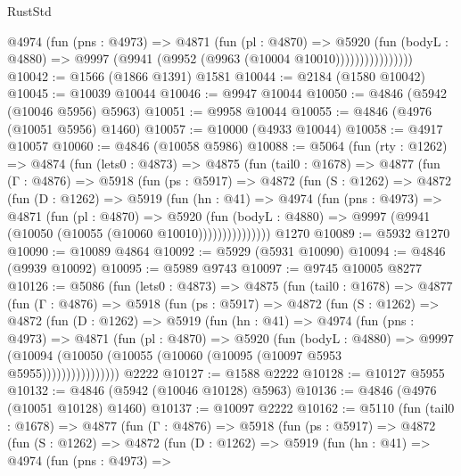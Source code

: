 \begin{lexlean}{RustStd}
\begin{coremodule}
                    @4974
                      (fun (pns : @4973) =>
                      @4871
                        (fun (pl : @4870) =>
                        @5920
                          (fun (bodyL : @4880) =>
                          @9997 (@9941 (@9952 (@9963 (@10004 @10010))))))))))))))))
@10042 := @1566 (@1866 @1391) @1581
@10044 := @2184 (@1580 @10042)
@10045 := @10039 @10044
@10046 := @9947 @10044
@10050 := @4846 (@5942 (@10046 @5956) @5963)
@10051 := @9958 @10044
@10055 := @4846 (@4976 (@10051 @5956) @1460)
@10057 := @10000 (@4933 @10044)
@10058 := @4917 @10057
@10060 := @4846 (@10058 @5986)
@10088 := @5064
    (fun (rty : @1262) =>
    @4874
      (fun (lets0 : @4873) =>
      @4875
        (fun (tail0 : @1678) =>
        @4877
          (fun (Γ : @4876) =>
          @5918
            (fun (ps : @5917) =>
            @4872
              (fun (S : @1262) =>
              @4872
                (fun (D : @1262) =>
                @5919
                  (fun (hn : @41) =>
                  @4974
                    (fun (pns : @4973) =>
                    @4871
                      (fun (pl : @4870) =>
                      @5920
                        (fun (bodyL : @4880) =>
                        @9997 (@9941 (@10050 (@10055 (@10060 @10010)))))))))))))))
    @1270
@10089 := @5932 @1270
@10090 := @10089 @4864
@10092 := @5929 (@5931 @10090)
@10094 := @4846 (@9939 @10092)
@10095 := @5989 @9743
@10097 := @9745 @10005 @8277
@10126 := @5086
    (fun (lets0 : @4873) =>
    @4875
      (fun (tail0 : @1678) =>
      @4877
        (fun (Γ : @4876) =>
        @5918
          (fun (ps : @5917) =>
          @4872
            (fun (S : @1262) =>
            @4872
              (fun (D : @1262) =>
              @5919
                (fun (hn : @41) =>
                @4974
                  (fun (pns : @4973) =>
                  @4871
                    (fun (pl : @4870) =>
                    @5920
                      (fun (bodyL : @4880) =>
                      @9997
                        (@10094 (@10050 (@10055 (@10060 (@10095 (@10097 @5953 @5955))))))))))))))))
    @2222
@10127 := @1588 @2222
@10128 := @10127 @5955
@10132 := @4846 (@5942 (@10046 @10128) @5963)
@10136 := @4846 (@4976 (@10051 @10128) @1460)
@10137 := @10097 @2222
@10162 := @5110
    (fun (tail0 : @1678) =>
    @4877
      (fun (Γ : @4876) =>
      @5918
        (fun (ps : @5917) =>
        @4872
          (fun (S : @1262) =>
          @4872
            (fun (D : @1262) =>
            @5919
              (fun (hn : @41) =>
              @4974
                (fun (pns : @4973) =>

\end{coremodule}
\end{lexlean}
